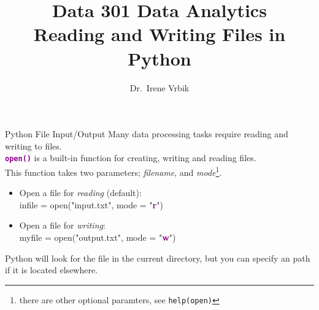 \documentclass[xcolor=svgnames]{beamer}
\title
  [Data 301 Data Analytics]
  {Data 301 Data Analytics\\
Reading and Writing Files in Python}
\author
  [Dr.\ Irene Vrbik]
  {Dr.\ Irene Vrbik}
\date
  {}
\institute
  {University of British Columbia Okanagan \newline irene.vrbik@ubc.ca}
\newcommand{\purple}[1]{{\textcolor{purple}{#1}}}
\newcommand{\nl}{\\[1em]}
\newcommand{\command}[1]{\texttt{\textbf{\textcolor{DarkMagenta}{#1}}}}
\newenvironment{allintypewriter}{\ttfamily}{\par}
\begin{document}
\maketitle




\begin{frame}{Python File Input/Output}
Many data processing tasks require reading and writing to files.\nl

\command{open()} is a built-in function for creating, writing and reading files.\nl

This function takes two parameters; \textit{filename}, and \textit{mode}\footnote{there are other optional paramters, see {\tt help(open)}}.\nl

\begin{itemize}
\item Open a file for \emph{reading} (default):\\
\begin{allintypewriter}
infile = open("input.txt", mode = "\purple{\bf r}")
\end{allintypewriter}
\item  Open a file for \emph{writing}:\\
\begin{allintypewriter}
myfile = open("output.txt",  mode = "\purple{\bf w}")
\end{allintypewriter}
\end{itemize}
\vfill
Python will look for the file in the current directory, but you can specify an path if it is located elsewhere.
\vfill
\end{frame}
\end{document}
